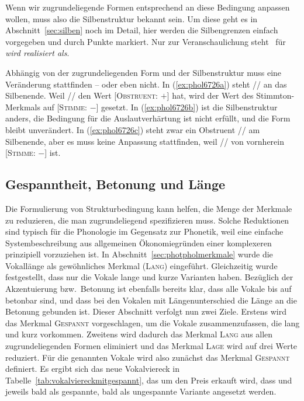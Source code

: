 Wenn wir zugrundeliegende Formen entsprechend an diese Bedingung anpassen wollen, muss also die Silbenstruktur bekannt sein.
Um diese geht es in Abschnitt~\ref{sec:silben} noch im Detail, hier werden die Silbengrenzen einfach vorgegeben und durch Punkte markiert. 
Nur zur Veranschaulichung steht \phopro\ für \textit{wird realisiert als}.

\begin{exe}
  \ex\label{ex:phol6726}
  \begin{xlist}
  \end{xlist}
\end{exe}

Abhängig von der zugrundeliegenden Form und der Silbenstruktur muss eine Veränderung stattfinden -- oder eben nicht.
In (\ref{ex:phol6726a}) steht // an das Silbenende.
Weil // den Wert [\textsc{Obstruent}: $+$] hat, wird der Wert des Stimmton-Merkmals auf [\textsc{Stimme}: $-$] gesetzt.
In (\ref{ex:phol6726b}) ist die Silbenstruktur anders, die Bedingung für die Auslautverhärtung ist nicht erfüllt, und die Form bleibt unverändert.
In (\ref{ex:phol6726c}) steht zwar ein Obstruent // am Silbenende, aber es muss keine Anpassung stattfinden, weil // von vornherein [\textsc{Stimme}: $-$] ist.

\subsection{Gespanntheit, Betonung und Länge}

\label{sec:gespanntheit}

Die Formulierung von Strukturbedingung kann helfen, die Menge der Merkmale zu reduzieren, die man zugrundeliegend spezifizieren muss.
Solche Reduktionen sind typisch für die Phonologie im Gegensatz zur Phonetik, weil eine einfache Systembeschreibung aus allgemeinen Ökonomiegründen einer komplexeren prinzipiell vorzuziehen ist.
In Abschnitt~\ref{sec:photpholmerkmale} wurde die Vokallänge als gewöhnliches Merkmal (\textsc{Lang}) eingeführt.
Gleichzeitig wurde festgestellt, dass nur die Vokale \textipa{[i y u e \o\ E o a]} lange und kurze Varianten haben.
Bezüglich der Akzentuierung bzw.\ Betonung ist ebenfalls bereits klar, dass alle Vokale bis auf \textipa{[@ 5]} betonbar sind, und dass bei den Vokalen mit Längenunterschied die Länge an die Betonung gebunden ist.
Dieser Abschnitt verfolgt nun zwei Ziele.
Erstens wird das Merkmal \textsc{Gespannt} vorgeschlagen, um die Vokale zusammenzufassen, die lang und kurz vorkommen.
Zweitens wird dadurch das Merkmal \textsc{Lang} aus allen zugrundeliegenden Formen eliminiert und das Merkmal \textsc{Lage} wird auf drei Werte reduziert.
Für die genannten Vokale wird also zunächst das Merkmal \textsc{Gespannt} definiert.
Es ergibt sich das neue Vokalviereck in Tabelle~\ref{tab:vokalviereckmitgespannt}, das um den Preis erkauft wird, dass \textipa{[E]} und \textipa{[a]} jeweils bald als gespannte, bald als ungespannte Variante angesetzt werden.

